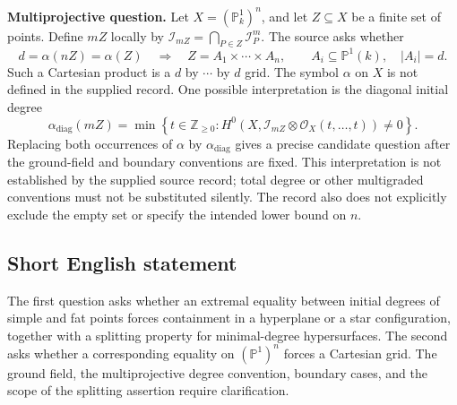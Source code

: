 \documentclass[11pt]{article}
\newcommand{\Z}{\mathbb{Z}}
\newcommand{\PP}{\mathbb{P}}
\begin{document}
\textbf{Multiprojective question.} Let \(X=(\PP^1_k)^n\), and let \(Z\subseteq X\) be a finite set of points. Define \(mZ\) locally by \(\mathcal I_{mZ}=\bigcap_{P\in Z}\mathcal I_P^m\). The source asks whether
\[
 d=\alpha(nZ)=\alpha(Z)
 \quad\Longrightarrow\quad
 Z=A_1\times\cdots\times A_n,
 \qquad A_i\subseteq\PP^1(k),\quad |A_i|=d.
\]
Such a Cartesian product is a \(d\) by \(\cdots\) by \(d\) grid. The symbol \(\alpha\) on \(X\) is not defined in the supplied record. One possible interpretation is the diagonal initial degree
\[
 \alpha_{\mathrm{diag}}(mZ)
 =\min\left\{t\in\Z_{\geq0}:
 H^0\!\left(X,\mathcal I_{mZ}\otimes\mathcal O_X(t,\ldots,t)\right)\neq0\right\}.
\]
Replacing both occurrences of \(\alpha\) by \(\alpha_{\mathrm{diag}}\) gives a precise candidate question after the ground-field and boundary conventions are fixed. This interpretation is not established by the supplied source record; total degree or other multigraded conventions must not be substituted silently. The record also does not explicitly exclude the empty set or specify the intended lower bound on \(n\).
\subsection{Short English statement}
The first question asks whether an extremal equality between initial degrees of simple and fat points forces containment in a hyperplane or a star configuration, together with a splitting property for minimal-degree hypersurfaces. The second asks whether a corresponding equality on \((\PP^1)^n\) forces a Cartesian grid. The ground field, the multiprojective degree convention, boundary cases, and the scope of the splitting assertion require clarification.
\end{document}
